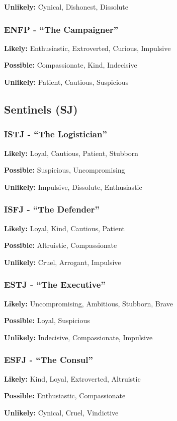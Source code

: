 \documentclass[a4paper,twoside,openany]{book}
\begin{document}
\begin{multicols}{2}
	\textbf{Unlikely:} Cynical, Dishonest, Dissolute

	\subsubsection*{ENFP - ``The Campaigner''}
	\textbf{Likely:} Enthusiastic, Extroverted, Curious, Impulsive

	\textbf{Possible:} Compassionate, Kind, Indecisive

	\textbf{Unlikely:} Patient, Cautious, Suspicious

	\subsection*{Sentinels (SJ)}
	\subsubsection*{ISTJ - ``The Logistician''}
	\textbf{Likely:} Loyal, Cautious, Patient, Stubborn

	\textbf{Possible:} Suspicious, Uncompromising

	\textbf{Unlikely:} Impulsive, Dissolute, Enthusiastic

	\subsubsection*{ISFJ - ``The Defender''}
	\textbf{Likely:} Loyal, Kind, Cautious, Patient

	\textbf{Possible:} Altruistic, Compassionate

	\textbf{Unlikely:} Cruel, Arrogant, Impulsive

	\subsubsection*{ESTJ - ``The Executive''}
	\textbf{Likely:} Uncompromising, Ambitious, Stubborn, Brave

	\textbf{Possible:} Loyal, Suspicious

	\textbf{Unlikely:} Indecisive, Compassionate, Impulsive

	\subsubsection*{ESFJ - ``The Consul''}
	\textbf{Likely:} Kind, Loyal, Extroverted, Altruistic

	\textbf{Possible:} Enthusiastic, Compassionate

	\textbf{Unlikely:} Cynical, Cruel, Vindictive


\end{multicols}
\end{document}
